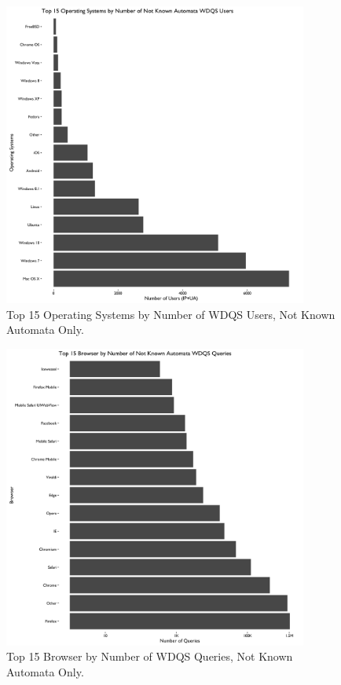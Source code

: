 \documentclass[12pt,]{article}
\begin{document}
\begin{figure}[H]
\centering
\includegraphics[width=10cm,height=10cm,keepaspectratio]{figures/n_user_by_os.png}
\caption{Top 15 Operating Systems by Number of WDQS Users, Not Known
Automata Only.}
\end{figure}

\begin{figure}[H]
\centering
\includegraphics[width=10cm,height=10cm,keepaspectratio]{figures/n_query_by_browser.png}
\caption{Top 15 Browser by Number of WDQS Queries, Not Known Automata
Only.}
\end{figure}
\end{document}
